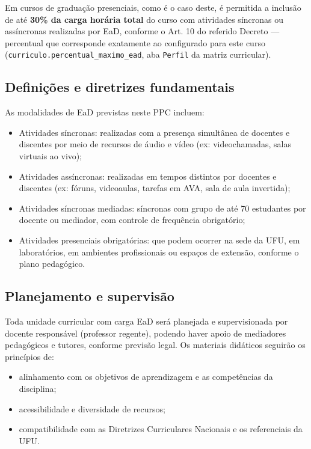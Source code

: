 Em cursos de graduação presenciais, como é o caso deste, é permitida a inclusão de até \textbf{30\% da carga horária total} do curso com atividades síncronas ou assíncronas realizadas por EaD, conforme o Art. 10 do referido Decreto — percentual que corresponde exatamente ao configurado para este curso (\texttt{curriculo.percentual\_maximo\_ead}, aba \texttt{Perfil} da matriz curricular).

\subsection{Definições e diretrizes fundamentais}

As modalidades de EaD previstas neste PPC incluem:

\begin{itemize}
    \item Atividades síncronas: realizadas com a presença simultânea de docentes e discentes por meio de recursos de áudio e vídeo (ex: videochamadas, salas virtuais ao vivo);
    \item Atividades assíncronas: realizadas em tempos distintos por docentes e discentes (ex: fóruns, videoaulas, tarefas em AVA, sala de aula invertida);
    \item Atividades síncronas mediadas: síncronas com grupo de até 70 estudantes por docente ou mediador, com controle de frequência obrigatório;
    \item Atividades presenciais obrigatórias: que podem ocorrer na sede da UFU, em laboratórios, em ambientes profissionais ou espaços de extensão, conforme o plano pedagógico.
\end{itemize}

\subsection{Planejamento e supervisão}
\label{sec:planejamento_ead}

Toda unidade curricular com carga EaD será planejada e supervisionada por docente responsável (professor regente), podendo haver apoio de mediadores pedagógicos e tutores, conforme previsão legal. Os materiais didáticos seguirão os princípios de:
\begin{itemize}
    \item alinhamento com os objetivos de aprendizagem e as competências da disciplina;
    \item acessibilidade e diversidade de recursos;
    \item compatibilidade com as Diretrizes Curriculares Nacionais e os referenciais da UFU.
\end{itemize}

